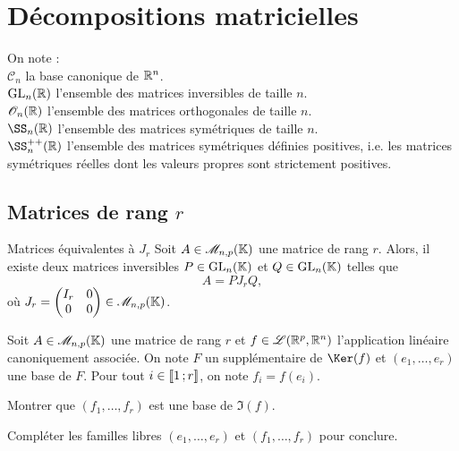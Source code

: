 \section{Décompositions matricielles}

\newcommand{\MM}{\mathscr{M}}
\newcommand{\OO}{\mathscr{O}}
\newcommand{\BB}{\mathscr{B}}
\newcommand{\CC}{\mathscr{C}}

On note :\\
$\CC_n$ la base canonique de $\mathbb{R}^n$.\\
$\mathrm{GL}_n(\mathbb{R})$ l'ensemble des matrices inversibles de taille $n$.\\
%
$\mathscr{O}_n(\mathbb{R})$ l'ensemble des matrices orthogonales de taille $n$.\\
%
$\SS_n(\R)$ l'ensemble des matrices symétriques de taille $n$.\\
%
$\SS_n^{++}(\R)$ l'ensemble des matrices symétriques définies positives, i.e. les matrices symétriques réelles dont les valeurs propres sont strictement positives.

\subsection{Matrices de rang $r$}

\begin{theo}{Matrices équivalentes à $J_r$}
Soit $A \in \MM_{n,p}(\K)$ une matrice de rang $r$. Alors, il existe deux matrices inversibles $P \in \mathrm{GL}_n(\mathbb{K})$ et $Q \in \mathrm{GL}_n(\mathbb{K})$ telles que
\[
A = P J_r Q,
\]
où $J_r = \begin{pmatrix} I_r & 0 \\ 0 & 0 \end{pmatrix} \in \MM_{n,p}(\K)$.
\end{theo}

\begin{exercice}
Soit $A \in \MM_{n,p}(\K)$ une matrice de rang $r$ et $f \in \mathscr{L}(\mathbb{R}^p, \mathbb{R}^n)$ l'application linéaire canoniquement associée. On note $F$ un supplémentaire de $\Ker(f)$ et $(e_1,\ldots,e_r)$ une base de $F$. Pour tout $i \in \llbracket 1\,; r \rrbracket$, on note $f_i = f(e_i)$.
\begin{questions}
\item Montrer que $(f_1,\ldots,f_r)$ est une base de $\Im(f)$.

\item Compléter les familles libres $(e_1,\ldots,e_r)$ et $(f_1,\ldots,f_r)$ pour conclure.
\end{questions}
\end{exercice}

